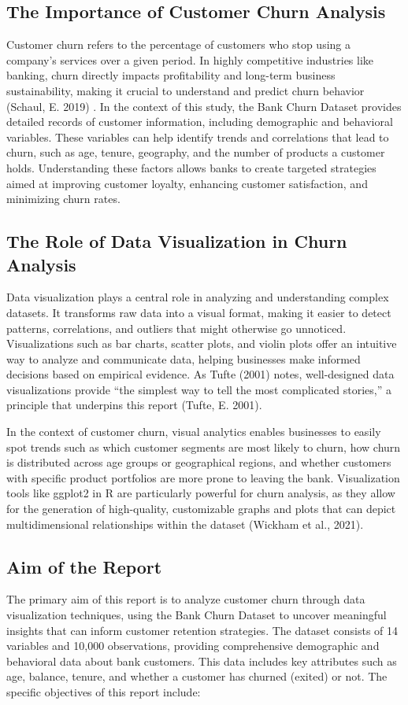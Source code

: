 \documentclass[12pt]{article}
\begin{document}
\subsection{The Importance of Customer Churn Analysis}
Customer churn refers to the percentage of customers who stop using a company's services over a given period. In highly competitive industries like banking, churn directly impacts profitability and long-term business sustainability, making it crucial to understand and predict churn behavior (Schaul, E. 2019) \cite{schaul2019}. In the context of this study, the Bank Churn Dataset provides detailed records of customer information, including demographic and behavioral variables. These variables can help identify trends and correlations that lead to churn, such as age, tenure, geography, and the number of products a customer holds. Understanding these factors allows banks to create targeted strategies aimed at improving customer loyalty, enhancing customer satisfaction, and minimizing churn rates.


\subsection{The Role of Data Visualization in Churn Analysis}
Data visualization plays a central role in analyzing and understanding complex datasets. It transforms raw data into a visual format, making it easier to detect patterns, correlations, and outliers that might otherwise go unnoticed. Visualizations such as bar charts, scatter plots, and violin plots offer an intuitive way to analyze and communicate data, helping businesses make informed decisions based on empirical evidence. As Tufte (2001) notes, well-designed data visualizations provide “the simplest way to tell the most complicated stories,” a principle that underpins this report (Tufte, E. 2001).\cite{tufte2001}


In the context of customer churn, visual analytics enables businesses to easily spot trends such as which customer segments are most likely to churn, how churn is distributed across age groups or geographical regions, and whether customers with specific product portfolios are more prone to leaving the bank. Visualization tools like ggplot2 in R are particularly powerful for churn analysis, as they allow for the generation of high-quality, customizable graphs and plots that can depict multidimensional relationships within the dataset (Wickham et al., 2021).\cite{wickham2021}

\subsection{Aim of the Report}
The primary aim of this report is to analyze customer churn through data visualization techniques, using the Bank Churn Dataset to uncover meaningful insights that can inform customer retention strategies. The dataset consists of 14 variables and 10,000 observations, providing comprehensive demographic and behavioral data about bank customers. This data includes key attributes such as age, balance, tenure, and whether a customer has churned (exited) or not. The specific objectives of this report include:
\end{document}
